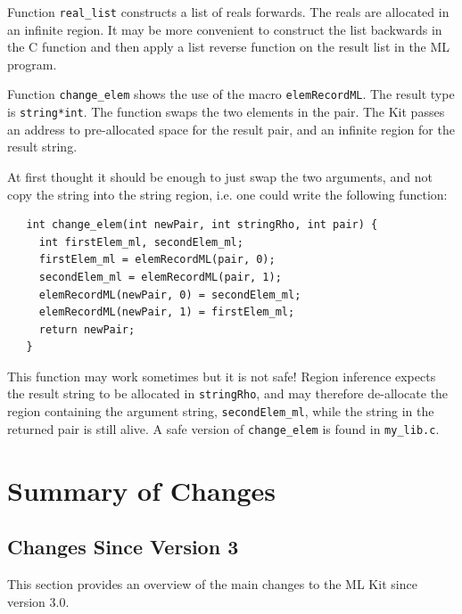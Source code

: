 \documentclass[12pt]{book}
\begin{document}
\begin{example}\label{real_list.ex}
  Function \texttt{real\_list} constructs a list
  of reals forwards. The reals are allocated in an infinite region. It
  may be more convenient to construct the list backwards in the C
  function and then apply a list reverse function on the result list
  in the ML program.
\end{example}

\begin{example}\label{change_elem.ex}
  Function \texttt{change\_elem} shows the use of
  the macro \texttt{elemRecordML}. The result type is \texttt{string*int}. The
  function swaps the two elements in the pair. The Kit passes an address to
  pre-allocated space for the result pair, and an infinite region for the
  result string.
  
  At first thought it should be enough to just swap the two arguments, and
  not copy the string into the string region, i.e. one could write the
  following function:
\begin{verbatim}
   int change_elem(int newPair, int stringRho, int pair) {
     int firstElem_ml, secondElem_ml;
     firstElem_ml = elemRecordML(pair, 0);
     secondElem_ml = elemRecordML(pair, 1);
     elemRecordML(newPair, 0) = secondElem_ml;
     elemRecordML(newPair, 1) = firstElem_ml;
     return newPair;
   }
\end{verbatim}
  This function may work sometimes but it is not safe! Region
  inference expects the result string to be allocated in
  \texttt{stringRho}, and may therefore de-allocate the region containing
  the argument string, \verb|secondElem_ml|, while the string in the
  returned pair is still alive. A safe version of \verb|change_elem| is
  found in \verb|my_lib.c|.
\end{example}

\chapter{Summary of Changes}

\section{Changes Since Version 3}
%
This section provides an overview of the main changes to the ML Kit
since version 3.0.
\end{document}
